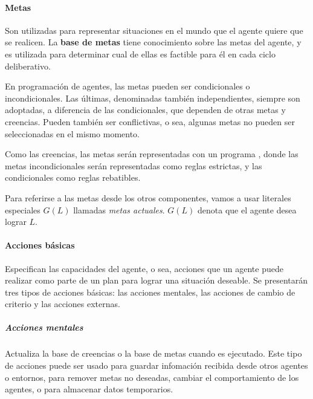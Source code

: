 \paragraph{Metas}

Son utilizadas para representar situaciones en el mundo que el agente quiere
que se realicen. La \textbf{base de metas} tiene conocimiento sobre las metas
del agente, y es utilizada para determinar cual de ellas es factible para él 
en cada ciclo deliberativo.

En programación de agentes, las metas pueden ser condicionales o 
incondicionales. Las últimas, denominadas también independientes, siempre son
adoptadas, a diferencia de las condicionales, que dependen de otras metas y 
creencias. Pueden también ser conflictivas, o sea, algunas metas no pueden
ser seleccionadas en el mismo momento. 

Como las creencias, las metas serán representadas con un programa \DLP, donde
las metas incondicionales serán representadas como reglas estrictas, y las 
condicionales como reglas rebatibles. 
%

Para referirse a las metas desde los otros componentes, vamos a usar literales
especiales $G(L)$ llamadas \textit{metas actuales}. $G(L)$ denota que el agente
desea lograr $L$.

\paragraph{Acciones básicas}

Especifican las capacidades del agente, o sea, acciones que un agente puede realizar como parte de un
plan para lograr una situación deseable. Se presentarán tres tipos de acciones básicas: las acciones
mentales, las acciones de cambio de criterio y las acciones externas.

\subparagraph{Acciones mentales}

Actualiza la base de creencias o la base de metas cuando es ejecutado. Este tipo de acciones puede ser
usado para guardar infomación recibida desde otros agentes o entornos, para remover metas no deseadas,
cambiar el comportamiento de los agentes, o para almacenar datos temporarios.

